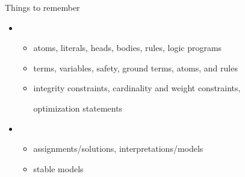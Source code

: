 \begin{frame}{Things to remember}
  \medskip
  \begin{itemize}
  \item {}
    \begin{itemize}\normalsize
    \item atoms, literals, heads, bodies, rules, \alert<2>{logic programs}
      \smallskip
    \item terms, variables, safety, ground terms, atoms, and rules
      \smallskip
    \item integrity constraints, cardinality and weight constraints,

      optimization statements
    \end{itemize}
  \bigskip
  \item {}
    \begin{itemize}\normalsize
    \item assignments/solutions, interpretations/models
      \smallskip
    \item \alert<2>{stable models}
    \end{itemize}
  \end{itemize}
\end{frame}
%
